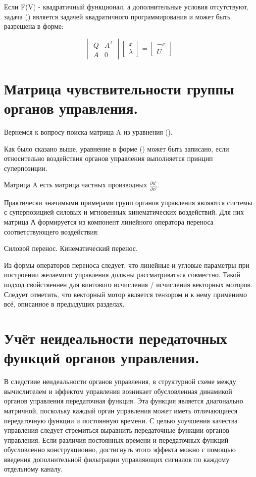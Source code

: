 \documentclass[a4paper]{article}
\begin{document}
Если F(V) - квадратичный функционал, а дополнительные условия отсутствуют, задача () является задачей квадратичного программирования и может быть разрешена в форме:

\begin{equation}
\begin{vmatrix}
Q & A^T\\
A & 0
\end{vmatrix}
\begin{bmatrix}
x\\
\lambda
\end{bmatrix}
=
\begin{bmatrix}
-c\\
U
\end{bmatrix}
\end{equation}

\section{Матрица чувствительности группы органов управления.}
Вернемся к вопросу поиска матрица A из уравнения ().

Как было сказано выше, уравнение в форме () может быть записано, если относительно воздействия органов управления выполняется принцип суперпозиции. 

Матрица A есть матрица частных производных $\frac{\partial{u^i}}{\partial{v^j}}$.

Практически значимыми примерами групп органов управления являются системы с суперпозицией силовых и мгновенных кинематических воздействий. Для них матрица А формируется из компонент линейного оператора переноса соответствующего воздействия:

Силовой перенос.
Кинематический перенос.

Из формы операторов переноса следует, что линейные и угловые параметры при построении желаемого управления должны рассматриваться совместно. Такой подход свойственнен для винтового исчисления / исчисления векторных моторов. Следует отметить, что векторный мотор является тензором и к нему применимо всё, описанное в предыдущих разделах.  

\section{Учёт неидеальности передаточных функций органов управления.}
В следствие неидеальности органов управления, в структурной схеме между вычислителем и эффектом управления возникает обусловленная динамикой органов управления передаточная функция. Эта функция является диагонально матричной, поскольку каждый орган управления может иметь отличающиеся передаточную функции и постоянную времени. С целью улучшения качества управления следует стремиться выравнить передаточные функции органов управления. Если различия постоянных времени и передаточных функций обусловленно конструкционно, достигнуть этого эффекта можно с помощью введения дополнительной фильтрации управляющих сигналов по каждому отдельному каналу.
\end{document}
